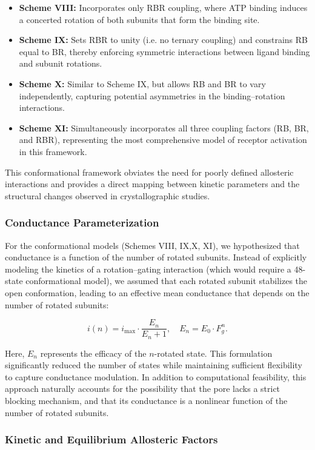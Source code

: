 \documentclass[pdflatex,sn-nature]{sn-jnl}%
\begin{document}
\begin{itemize}
    \item \textbf{Scheme VIII:} Incorporates only RBR coupling, where ATP binding induces a concerted rotation of both subunits that form the binding site.
    \item \textbf{Scheme IX:} Sets RBR to unity (i.e. no ternary coupling) and constrains RB equal to BR, thereby enforcing symmetric interactions between ligand binding and subunit rotations.
    \item \textbf{Scheme X:} Similar to Scheme IX, but allows RB and BR to vary independently, capturing potential asymmetries in the binding–rotation interactions.
    \item \textbf{Scheme XI:} Simultaneously incorporates all three coupling factors (RB, BR, and RBR), representing the most comprehensive model of receptor activation in this framework.
\end{itemize}

This conformational framework obviates the need for poorly defined allosteric interactions and provides a direct mapping between kinetic parameters and the structural changes observed in crystallographic studies.
\subsubsection{Conductance Parameterization}

For the conformational models (Schemes VIII, IX,X, XI), we hypothesized that conductance is a function of the number of rotated subunits. Instead of explicitly modeling the kinetics of a rotation–gating interaction (which would require a 48-state conformational model), we assumed that each rotated subunit stabilizes the open conformation, leading to an effective mean conductance that depends on the number of rotated subunits:

\[
i(n) = i_{\text{max}} \cdot \frac{E_n}{E_n + 1}, \quad E_n = E_0 \cdot F_g^n.
\]

Here, \( E_n \) represents the efficacy of the \( n \)-rotated state. This formulation significantly reduced the number of states while maintaining sufficient flexibility to capture conductance modulation. In addition to computational feasibility, this approach naturally accounts for the possibility that the pore lacks a strict blocking mechanism, and that its conductance is a nonlinear function of the number of rotated subunits.

\subsubsection{Kinetic and Equilibrium Allosteric Factors}
\end{document}
